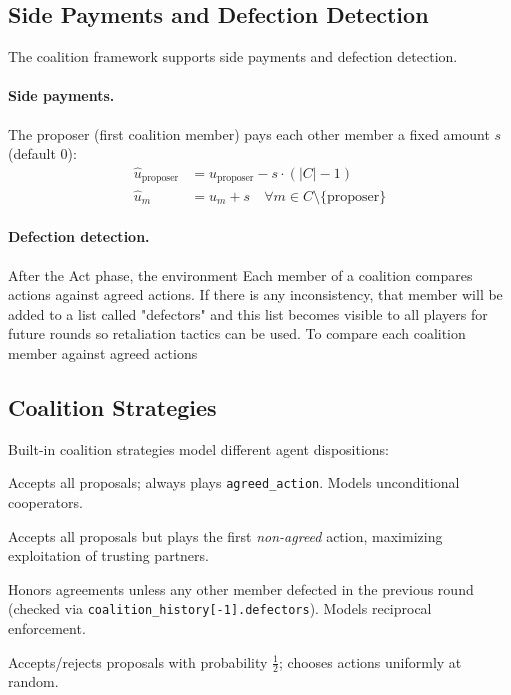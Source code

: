 \subsection{Side Payments and Defection Detection}
\label{sec:side-payments}

The coalition framework supports side payments and defection detection.

\paragraph{Side payments.} The proposer (first coalition member) pays each
other member a fixed amount $s$ (default $0$):
\begin{align}
\hat{u}_{\text{proposer}} &= u_{\text{proposer}} - s \cdot (|C| - 1) \\
\hat{u}_{m} &= u_m + s \quad \forall m \in C \setminus \{\text{proposer}\}
\end{align}

\paragraph{Defection detection.} After the Act phase, the environment
Each member of a coalition compares actions against agreed actions. If there is any inconsistency, that member will be added to a list called "defectors" and this list becomes visible to all players for future rounds so retaliation tactics can be used. To compare each coalition member against agreed actions

\subsection{Coalition Strategies}
\label{sec:coalition-strategies}

Built-in coalition strategies model different agent dispositions:

\begin{description}[nosep]
    \item[Loyal.] Accepts all proposals; always plays \texttt{agreed\_action}.
        Models unconditional cooperators.
    \item[Betrayer.] Accepts all proposals but plays the first \emph{non-agreed}
        action, maximizing exploitation of trusting partners.
    \item[Conditional.] Honors agreements unless any other member defected
        in the previous round (checked via \texttt{coalition\_history[-1].defectors}).
        Models reciprocal enforcement.
    \item[Random.] Accepts/rejects proposals with probability $\frac{1}{2}$;
        chooses actions uniformly at random.
\end{description}

